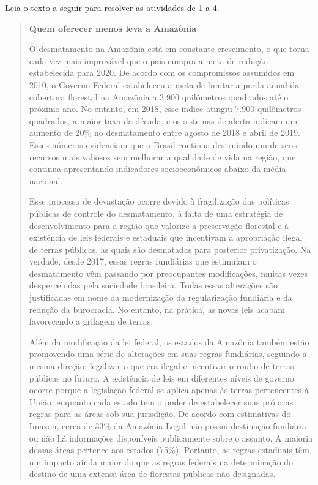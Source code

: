 
Leia o texto a seguir para resolver as atividades de 1 a 4.

\begin{quote}
\textbf{Quem oferecer menos leva a Amazônia}

O desmatamento na Amazônia está em constante crescimento, o que torna
cada vez mais improvável que o país cumpra a meta de redução
estabelecida para 2020. De acordo com os compromissos assumidos em 2010,
o Governo Federal estabeleceu a meta de limitar a perda anual da
cobertura florestal na Amazônia a 3.900 quilômetros quadrados até o
próximo ano. No entanto, em 2018, esse índice atingiu 7.900 quilômetros
quadrados, a maior taxa da década, e os sistemas de alerta indicam um
aumento de 20\% no desmatamento entre agosto de 2018 e abril de 2019.
Esses números evidenciam que o Brasil continua destruindo um de seus
recursos mais valiosos sem melhorar a qualidade de vida na região, que
continua apresentando indicadores socioeconômicos abaixo da média
nacional.

Esse processo de devastação ocorre devido à fragilização das políticas
públicas de controle do desmatamento, à falta de uma estratégia de
desenvolvimento para a região que valorize a preservação florestal e à
existência de leis federais e estaduais que incentivam a apropriação
ilegal de terras públicas, as quais são desmatadas para posterior
privatização. Na verdade, desde 2017, essas regras fundiárias que
estimulam o desmatamento vêm passando por preocupantes modificações,
muitas vezes despercebidas pela sociedade brasileira. Todas essas
alterações são justificadas em nome da modernização da regularização
fundiária e da redução da burocracia. No entanto, na prática, as novas
leis acabam favorecendo a grilagem de terras.

Além da modificação da lei federal, os estados da Amazônia também estão
promovendo uma série de alterações em suas regras fundiárias, seguindo a
mesma direção: legalizar o que era ilegal e incentivar o roubo de terras
públicas no futuro. A existência de leis em diferentes níveis de governo
ocorre porque a legislação federal se aplica apenas às terras
pertencentes à União, enquanto cada estado tem o poder de estabelecer
suas próprias regras para as áreas sob sua jurisdição. De acordo com
estimativas do Imazon, cerca de 33\% da Amazônia Legal não possui
destinação fundiária ou não há informações disponíveis publicamente
sobre o assunto. A maioria dessas áreas pertence aos estados (75\%).
Portanto, as regras estaduais têm um impacto ainda maior do que as
regras federais na determinação do destino de uma extensa área de
florestas públicas não designadas.
\end{quote}


